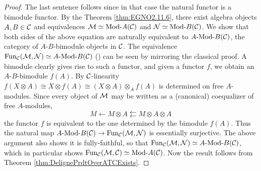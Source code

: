 \documentclass{amsart}
\begin{document}
\begin{proof}
	The last sentence follows since in that case the natural functor is a bimodule functor. By the Theorem \ref{thm:EGNO2.11.6}, there exist algebra objects $A, B \in \mathcal C$ and equivalences $\cM \simeq \Mod{}{A}(\cC)$ and $\cN \simeq \Mod{}{B}(\cC)$. We show that both sides of the above equation are naturally equivalent to $\Mod{A}{B}(\cC)$, the category of $A$-$B$-bimodule objects in $\mathcal C$. The equivalence $\Fun_\cC(\cM, \cN) \simeq \Mod{A}{B}(\cC)$ (\cite[Prop 2.12.2]{EGNO}) can be seen by mirroring the classical proof. A bimodule clearly gives rise to such a functor, and given a functor $f$, we obtain an $A$-$B$-bimodule $f(A)$. By $\mathcal C$-linearity $f(X \otimes A) \cong X \otimes f(A)  \cong (X \otimes A) \otimes_A f(A) $ is determined on free $A$-modules. Since every object of $\mathcal M$ may be written as a (canonical) coequalizer of free $A$-modules,
	\begin{equation*}
		M \leftarrow M \otimes A \leftleftarrows M \otimes A \otimes A
	\end{equation*} 
the functor $f$ is equivalent to the one determined by the bimodule $f(A)$. Thus the natural map  $\Mod{A}{B}(\cC) \to \Fun_\cC(\cM, \cN)$ is essentially surjective. The above argument also shows it is fully-faithful, so that $\Fun_\cC(\cM, \cN) \simeq \Mod{A}{B}(\cC)$, which in particular shows $\Fun_\cC(\cM, \cC) \simeq \Mod{}{A}(\cC)$. Now the result follows from Theorem \ref{thm:DelignePrdtOverATCExists}.
\end{proof}
\end{document}
